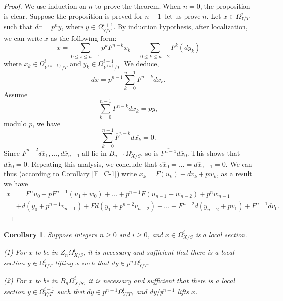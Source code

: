 \documentclass[a4paper,12pt,twoside]{report}
\newtheorem{corollary}[theorem]{Corollary}
\begin{document}
\begin{appendices}
    \begin{proof}
         We use induction on $n$ to prove the theorem. When $n=0$, the proposition is clear. 
    Suppose the proposition is proved for $n-1$, let us prove $n$. 
    Let $x\in \Omega_{Y/T}^i$ such that $dx=p^ny$, where $y\in\Omega^{i+1}_{Y/T}$. 
    By induction hypothesis, after localization, we can write $x$ as the following form: 
    \[x=\sum_{0\leqslant k\leqslant n-1}p^kF^{n-k}x_k+\sum_{0\leqslant k\leqslant n-2}F^k(dy_k)\]
    where $x_k\in \Omega^i_{Y^{(n-k)}/T}$ and $y_k\in \Omega^{i-1}_{Y^{(k)}/T}$. We deduce, 
    \[dx=p^{n-1}\sum_{k=0}^{n-1}F^{n-k}dx_k.\]
    Assume \[\sum_{k=0}^{n-1}F^{n-k}dx_k=py,\] modulo $p$, we have \[\sum_{k=0}^{n-1}\overline{F}^{n-k}d\overline{x_k}=0.\]
    Since $\overline{F}^{n-2}d\overline{x}_1,...,d\overline{x}_{n-1}$ all lie in $B_{n-1}\Omega^i_{X/S}$, 
    so is $\overline{F^{n-1}}d\overline{x}_0$. This shows that $d\overline{x}_0=0$. 
    Repeating this analysis, we conclude that $d\overline{x}_0=...=d\overline{x}_{n-1}=0$. 
    We can thus (according to Corollary \ref{F=C-1}) write $x_k=F(u_k)+dv_k+pw_k$, as a result we have 
    \[\begin{aligned}
        x&=F^nu_0+pF^{n-1}(u_1+w_0)+...+p^{n-1}F(u_{n-1}+w_{n-2})+p^nw_{n-1}\\
        &+d(y_0+p^{n-1}v_{n-1})+Fd(y_1+p^{n-2}v_{n-2})+...+F^{n-2}d(y_{n-2}+pv_1)+F^{n-1}dv_0.
    \end{aligned}\]
    \end{proof}
    
    \begin{corollary}\label{BnZnlifting}
        Suppose integers $n\geqslant 0$ and $i\geqslant 0$, and $x\in \Omega^i_{X/S}$ is a local section. 
    
        {\rm (1)} For $x$ to be in $Z_n\Omega^i_{X/S}$, it is necessary and sufficient that there is a local section 
        $y\in \Omega^i_{Y/T}$ lifting $x$ such that $dy\in p^n\Omega^i_{Y/T}$. 
    
        {\rm (2)} For $x$ to be in $B_n\Omega^i_{X/S}$, it is necessary and sufficient that there is a local section 
        $y\in \Omega^{i-1}_{Y/T}$ such that $dy\in p^{n-1}\Omega^i_{Y/T}$, and $dy/p^{n-1}$ lifts $x$. 
    \end{corollary}
\end{appendices}
    



\end{document}

